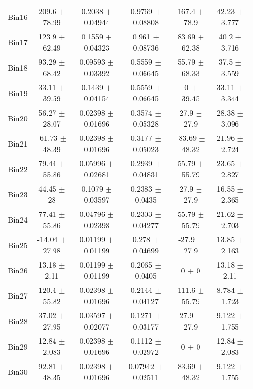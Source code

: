 \begin{tabular}{@{\extracolsep{4pt}}lccccc@{}}
     Bin16 & 209.6 $\pm$ 78.99 & 0.2038 $\pm$ 0.04944 & 0.9769 $\pm$ 0.08808 & 167.4 $\pm$ 78.9 & 42.23 $\pm$ 3.777 \\ 
     Bin17 & 123.9 $\pm$ 62.49 & 0.1559 $\pm$ 0.04323 & 0.961 $\pm$ 0.08736 & 83.69 $\pm$ 62.38 & 40.2 $\pm$ 3.716 \\ 
     Bin18 & 93.29 $\pm$ 68.42 & 0.09593 $\pm$ 0.03392 & 0.5559 $\pm$ 0.06645 & 55.79 $\pm$ 68.33 & 37.5 $\pm$ 3.559 \\ 
     Bin19 & 33.11 $\pm$ 39.59 & 0.1439 $\pm$ 0.04154 & 0.5559 $\pm$ 0.06645 & 0 $\pm$ 39.45 & 33.11 $\pm$ 3.344 \\ 
     Bin20 & 56.27 $\pm$ 28.07 & 0.02398 $\pm$ 0.01696 & 0.3574 $\pm$ 0.05328 & 27.9 $\pm$ 27.9 & 28.38 $\pm$ 3.096 \\ 
     Bin21 & -61.73 $\pm$ 48.39 & 0.02398 $\pm$ 0.01696 & 0.3177 $\pm$ 0.05023 & -83.69 $\pm$ 48.32 & 21.96 $\pm$ 2.724 \\ 
     Bin22 & 79.44 $\pm$ 55.86 & 0.05996 $\pm$ 0.02681 & 0.2939 $\pm$ 0.04831 & 55.79 $\pm$ 55.79 & 23.65 $\pm$ 2.827 \\ 
     Bin23 & 44.45 $\pm$ 28 & 0.1079 $\pm$ 0.03597 & 0.2383 $\pm$ 0.0435 & 27.9 $\pm$ 27.9 & 16.55 $\pm$ 2.365 \\ 
     Bin24 & 77.41 $\pm$ 55.86 & 0.04796 $\pm$ 0.02398 & 0.2303 $\pm$ 0.04277 & 55.79 $\pm$ 55.79 & 21.62 $\pm$ 2.703 \\ 
     Bin25 & -14.04 $\pm$ 27.98 & 0.01199 $\pm$ 0.01199 & 0.278 $\pm$ 0.04699 & -27.9 $\pm$ 27.9 & 13.85 $\pm$ 2.163 \\ 
     Bin26 & 13.18 $\pm$ 2.11 & 0.01199 $\pm$ 0.01199 & 0.2065 $\pm$ 0.0405 & 0 $\pm$ 0 & 13.18 $\pm$ 2.11 \\ 
     Bin27 & 120.4 $\pm$ 55.82 & 0.02398 $\pm$ 0.01696 & 0.2144 $\pm$ 0.04127 & 111.6 $\pm$ 55.79 & 8.784 $\pm$ 1.723 \\ 
     Bin28 & 37.02 $\pm$ 27.95 & 0.03597 $\pm$ 0.02077 & 0.1271 $\pm$ 0.03177 & 27.9 $\pm$ 27.9 & 9.122 $\pm$ 1.755 \\ 
     Bin29 & 12.84 $\pm$ 2.083 & 0.02398 $\pm$ 0.01696 & 0.1112 $\pm$ 0.02972 & 0 $\pm$ 0 & 12.84 $\pm$ 2.083 \\ 
     Bin30 & 92.81 $\pm$ 48.35 & 0.02398 $\pm$ 0.01696 & 0.07942 $\pm$ 0.02511 & 83.69 $\pm$ 48.32 & 9.122 $\pm$ 1.755 \\ 
\hline\hline
  \end{tabular}
